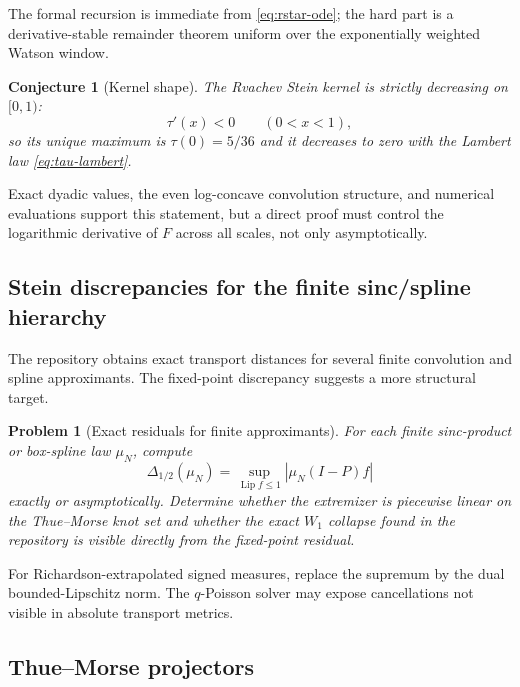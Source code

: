 \documentclass[11pt,a4paper]{article}
\newtheorem{conjecture}[theorem]{Conjecture}
\newtheorem{problem}[theorem]{Problem}
\theoremstyle{definition}
\theoremstyle{remark}
\newcommand{\Lip}{\operatorname{Lip}}
\begin{document}
The formal recursion is immediate from \eqref{eq:rstar-ode}; the hard part is a derivative-stable remainder theorem uniform over the exponentially weighted Watson window.

\begin{conjecture}[Kernel shape]
\label{conj:kernel-shape}
The Rvachev Stein kernel is strictly decreasing on $[0,1)$:
\begin{equation}
 \tau'(x)<0\qquad(0<x<1),
 \label{eq:tau-monotone}
\end{equation}
so its unique maximum is $\tau(0)=5/36$ and it decreases to zero with the Lambert law \eqref{eq:tau-lambert}.
\end{conjecture}

Exact dyadic values, the even log-concave convolution structure, and numerical evaluations support this statement, but a direct proof must control the logarithmic derivative of $F$ across all scales, not only asymptotically.

\subsection{Stein discrepancies for the finite sinc/spline hierarchy}

The repository obtains exact transport distances for several finite convolution and spline approximants. The fixed-point discrepancy suggests a more structural target.

\begin{problem}[Exact residuals for finite approximants]
For each finite sinc-product or box-spline law $\mu_N$, compute
\begin{equation}
 \Delta_{1/2}(\mu_N)
 =\sup_{\Lip f\le1}|\mu_N(I-P)f|
 \label{eq:finite-discrepancy}
\end{equation}
exactly or asymptotically. Determine whether the extremizer is piecewise linear on the Thue--Morse knot set and whether the exact $W_1$ collapse found in the repository is visible directly from the fixed-point residual.
\end{problem}

For Richardson-extrapolated signed measures, replace the supremum by the dual bounded-Lipschitz norm. The $q$-Poisson solver may expose cancellations not visible in absolute transport metrics.

\subsection{Thue--Morse projectors}
\end{document}
